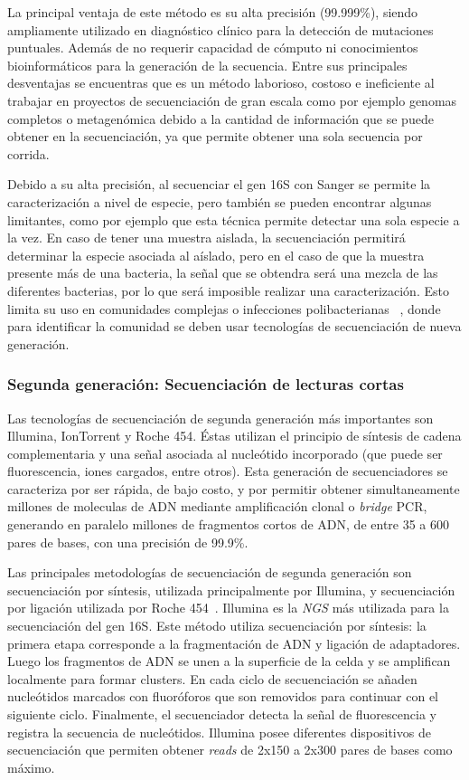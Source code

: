 La principal ventaja de este método es su alta precisión (99.999\%), siendo ampliamente utilizado en diagnóstico clínico para la detección de mutaciones puntuales. Además de no requerir capacidad de cómputo ni conocimientos bioinformáticos para la generación de la secuencia.  
Entre sus principales desventajas se encuentras que es un método laborioso, costoso e ineficiente al trabajar en proyectos de secuenciación de gran escala como por ejemplo genomas completos o metagenómica debido a la cantidad de información que se puede obtener en la secuenciación, ya que permite obtener una sola secuencia por corrida.
 
Debido a su alta precisión, al secuenciar el gen 16S con Sanger se permite la caracterización a nivel de especie, pero también se pueden encontrar algunas limitantes, como por ejemplo que esta técnica permite detectar una sola especie a la vez. En caso de tener una muestra aislada, la secuenciación permitirá determinar la especie asociada al aíslado, pero en el caso de que la muestra presente más de una bacteria, la señal que se obtendra será una mezcla de las diferentes bacterias, por lo que será imposible realizar una caracterización. 
Esto limita su uso en comunidades complejas o infecciones polibacterianas ~\cite{lamoureux2022prospective}, donde para identificar la comunidad se deben usar tecnologías de secuenciación de nueva generación.
\subsubsection{Segunda generación: Secuenciación de lecturas cortas}
Las tecnologías de secuenciación de segunda generación más importantes son Illumina, IonTorrent y Roche 454. Éstas utilizan el principio de síntesis de cadena complementaria y una señal asociada al nucleótido incorporado (que puede ser fluorescencia, iones cargados, entre otros). %
Esta generación de secuenciadores se caracteriza por ser rápida, de bajo costo, y por permitir obtener simultaneamente millones de moleculas de ADN mediante amplificación clonal o \textit{bridge} PCR, generando en paralelo millones de fragmentos cortos de ADN, de entre 35 a 600 pares de bases, con una precisión de 99.9\%.%


Las principales metodologías de secuenciación de segunda generación son secuenciación por síntesis, utilizada principalmente por Illumina, y secuenciación por ligación utilizada por Roche 454~\cite{mardis2008next}.
Illumina es la \textit{NGS} más utilizada para la secuenciación del gen 16S. Este método utiliza secuenciación por síntesis: la primera etapa corresponde a la fragmentación de ADN y ligación de adaptadores.
Luego los fragmentos de ADN se unen a la superficie de la celda y se amplifican localmente para formar clusters. 
En cada ciclo de secuenciación se añaden nucleótidos marcados con fluoróforos que son removidos para continuar con el siguiente ciclo.
Finalmente, el secuenciador detecta la señal de fluorescencia y registra la secuencia de nucleótidos. 
Illumina posee diferentes dispositivos de secuenciación que permiten obtener \textit{reads} de 2x150 a 2x300 pares de bases como máximo.

